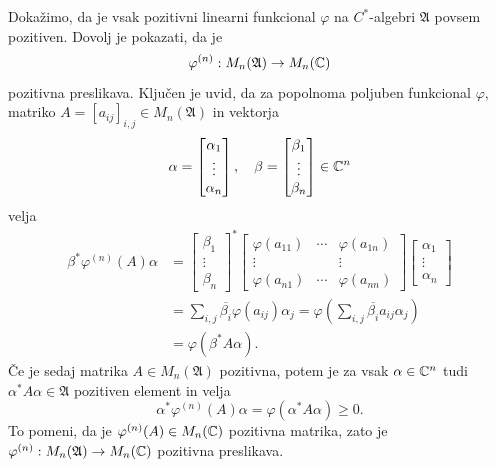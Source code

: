 \begin{zgled}\label{zgl:1.3}
    Dokažimo, da je vsak pozitivni linearni funkcional $\varphi$ na $C^*$-algebri $\mathfrak{A}$ povsem pozitiven.
    Dovolj je pokazati, da je $$\varphi^{(n)} : M_n (\mathfrak{A}) \to M_n (\mathbb C)$$
    pozitivna preslikava. Ključen je uvid, da za popolnoma poljuben funkcional $\varphi$, matriko $A = [a_{ij}]_{i, j} \in M_n (\mathfrak{A})$
    in vektorja $$\alpha = \begin{bmatrix}
        \alpha_1 \\ \vdots \\ \alpha_n
    \end{bmatrix},\quad \beta = \begin{bmatrix}
        \beta_1 \\ \vdots \\ \beta_n
    \end{bmatrix} \in \mathbb C^n$$ velja 
    \begin{align*}
        \beta^* \varphi^{(n)} (A) \alpha &= \begin{bmatrix}
            \beta_1  \\ \vdots \\ \beta_n 
        \end{bmatrix}^*
        \begin{bmatrix}
            \varphi (a_{11}) & \cdots & \varphi(a_{1n})\\
            \vdots & & \vdots\\
            \varphi (a_{n1}) & \cdots & \varphi(a_{nn})
        \end{bmatrix}
        \begin{bmatrix}
            \alpha_1 \\ \vdots \\ \alpha_n
        \end{bmatrix} \\
        &= \sum_{i, j} \overline{\beta_i} \varphi(a_{ij}) \alpha_j  = \varphi \left(\sum_{i, j} \overline{\beta_i} a_{ij} \alpha_j \right)\\
        &= \varphi(\beta^* A \alpha).
    \end{align*}
    Če je sedaj matrika $A \in M_n (\mathfrak{A})$ pozitivna, potem je za vsak $\alpha \in \mathbb C^n$
    tudi $\alpha^* A \alpha \in \mathfrak{A}$ pozitiven element in velja 
    $$\alpha^* \varphi^{(n)}(A) \alpha = \varphi(\alpha^* A \alpha) \geq 0.$$
    To pomeni, da je $\varphi^{(n)} (A) \in M_n (\mathbb C)$ pozitivna matrika, zato je $\varphi^{(n)}: M_n (\mathfrak{A}) \to M_n (\mathbb C)$ pozitivna preslikava.
\end{zgled}


